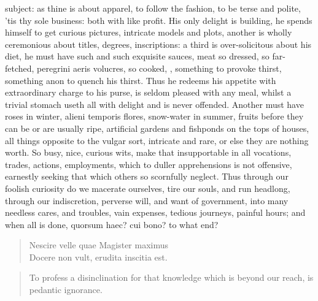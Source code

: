 {subject: as thine is about apparel, to follow the fashion, to be terse
and polite, 'tis thy sole business: both with like profit. His only
delight is building, he spends himself to get curious pictures,
intricate models and plots, another is wholly ceremonious about titles,
degrees, inscriptions: a third is over-solicitous about his diet, he
must have such and such exquisite sauces, meat so dressed, so
far-fetched, peregrini aeris volucres, so cooked, \etc{}, something to
provoke thirst, something anon to quench his thirst. Thus he redeems
his appetite with extraordinary charge to his purse, is seldom pleased
with any meal, whilst a trivial stomach useth all with delight and is
never offended. Another must have roses in winter, alieni temporis
flores, snow-water in summer, fruits before they can be or are usually
ripe, artificial gardens and fishponds on the tops of houses, all
things opposite to the vulgar sort, intricate and rare, or else they
are nothing worth. So busy, nice, curious wits, make that insupportable
in all vocations, trades, actions, employments, which to duller
apprehensions is not offensive, earnestly seeking that which others so
scornfully neglect. Thus through our foolish curiosity do we macerate
ourselves, tire our souls, and run headlong, through our indiscretion,
perverse will, and want of government, into many needless cares, and
troubles, vain expenses, tedious journeys, painful hours; and when all
is done, quorsum haec? cui bono? to what end?
%
\begin{latin}
\begin{quote}
Nescire velle quae Magister maximus\\
Docere non vult, erudita inscitia est.
\end{quote}
\end{latin}
\translationrule
\begin{quote}%
To profess a disinclination for that knowledge which is beyond our reach, is pedantic ignorance.
\end{quote}
%
}
